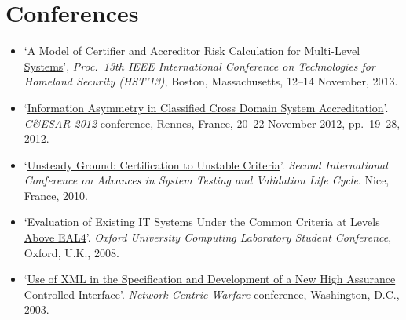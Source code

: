 \documentclass[12pt,twoside,letterpaper]{article}
\begin{document}
\vspace{-8mm}
\section*{Conferences}
\vspace{-2mm}
\begin{itemize}
	\item `\href{http://ieee-hst.org/agenda/papers/papers_sched.html#cyber4}{A Model of
		Certifier and Accreditor Risk Calculation for Multi-Level Systems}',
		\emph{Proc.\ 13th IEEE International Conference on Technologies for
		Homeland Security (HST'13)}, Boston, Massachusetts, 12--14 November, 2013.

	\item `\href{http://applied-math.org/CESAR2012_information_asymmetry.pdf}{Information
		Asymmetry in Classified Cross Domain System Accreditation}'. \emph{C\&ESAR 2012}
		conference, Rennes, France, 20--22 November 2012, pp.\ 19--28, 2012.

	\item `\href{http://ieeexplore.ieee.org/xpls/abs_all.jsp?arnumber=5617171&tag=1}{Unsteady
		Ground: Certification to Unstable Criteria}'. \emph{Second International Conference
		on Advances in System Testing and Validation Life Cycle}. Nice, France, 2010. 

	\item `\href{http://www.cs.ox.ac.uk/files/1328/RR-08-10.pdf}{Evaluation of Existing IT
		Systems Under the Common Criteria at Levels Above EAL4}'. \emph{Oxford University
		Computing Laboratory Student Conference}, Oxford, U.K., 2008.

    \item `\href{https://docs.google.com/viewer?a=v&q=cache:OjDo4H9Pj10J:citeseerx.ist.psu.edu/viewdoc/download%3Fdoi%3D10.1.1.10.4531%26rep%3Drep1%26type%3Dpdf+&hl=en&gl=uk&pid=bl&srcid=ADGEESgzzne2bVzWsUDU4ITF7lKKcGhA_k51PqkEVB7aiZgGgJ65C9VGGFIDIL2TQ_YUcdDO20UNkw-mnwZN71u0JDy5EYltrpjR_If5ZU8yyXc400Izs9ywtAeLkxHyxd02fNek-mj4&sig=AHIEtbQHRLT1rO3Eft0-P1LmHBrZ7zJL7w}{Use
		of XML in the Specification and Development of a New High Assurance Controlled Interface}'.
		\emph{Network Centric Warfare} conference, Washington, D.C., 2003.
\end{itemize}

\vspace{-8mm}
\end{document}
